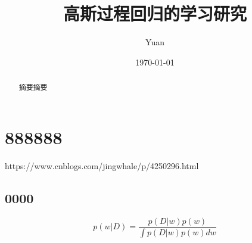 \documentclass[12pt,a4paper,draft]{ctexart}
\title{高斯过程回归的学习研究}
\author{Yuan}
\date{\today}
\begin{document}
\maketitle
\begin{abstract}
摘要摘要
\end{abstract}	
\section{888888}
https://www.cnblogs.com/jingwhale/p/4250296.html
\subsection{0000}
\[ p(w|D)=\frac{p(D|w)p(w)}{\int p(D|w)p(w)dw} \]
\end{document}
